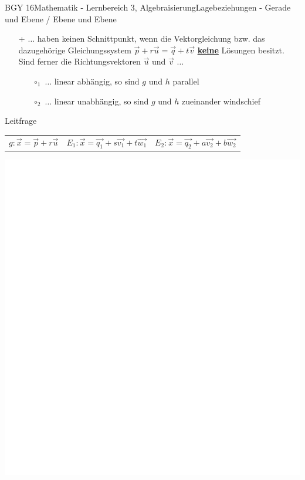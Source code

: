 \documentclass[oneside,openany,headings=optiontotoc,11pt,numbers=noenddot]{scrreprt}
\begin{document}
\begin{worksheet}{BGY 16}{Mathematik - Lernbereich 3, Algebraisierung}{Lagebeziehungen - Gerade und Ebene / Ebene und Ebene}
\begin{framed}
\begin{itemize}
				\item[+] \(\ldots\) haben \color{red}keinen\normalcolor{} Schnittpunkt, wenn die Vektorgleichung bzw. das dazugehörige Gleichungssystem \(\vec{p} + r\vec{u} = \vec{q} + t\vec{v}\) \underline{\textbf{keine}} Lösungen besitzt.\\
				Sind ferner die Richtungsvektoren \(\vec{u}\) und \(\vec{v}\) \(\ldots\)
				\begin{itemize}
					\item[\(\circ_1\)] \(\ldots\) linear \color{blue}abhängig\normalcolor{}, so sind \(g\) und \(h\) \color{red}parallel\normalcolor{}
					\item[\(\circ_2\)] \(\ldots\) linear \color{blue}unabhängig\normalcolor{}, so sind \(g\) und \(h\) zueinander \color{red}windschief\normalcolor{}
				\end{itemize}
			\end{itemize}
		\end{framed}
		\begin{framed}
			\tiny{\color{codegray}Leitfrage}\\\normalcolor\normalsize
			\begin{tabularx}{\textwidth}{XXX}
				\colorbox{blue!5}{\(g: \vec{x} = \vec{p} + r\vec{u}\)} & \colorbox{blue!5}{\(E_1: \vec{x} = \vec{q_1} + s\vec{v_1} + t\vec{w_1}\)} & \colorbox{blue!5}{\(E_2: \vec{x} = \vec{q_2} + a\vec{v_2} + b\vec{w_2}\)}				
			\end{tabularx}
			\includegraphics[scale=0.55]{../empty.jpg}

\end{framed}
\end{worksheet}
\end{document}
